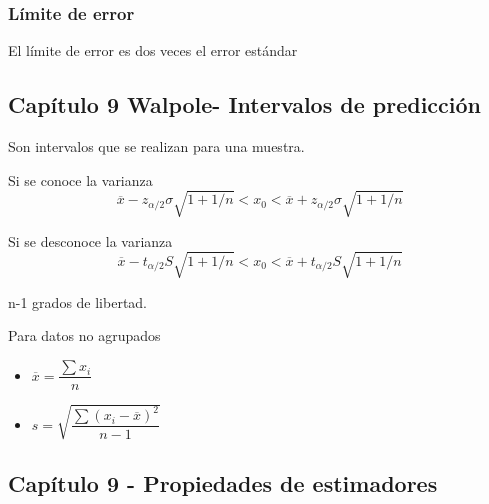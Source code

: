 \subsubsection{Límite de error}
El límite de error es dos veces el error estándar

\subsection{Capítulo 9 Walpole- Intervalos de predicción}
Son intervalos que se realizan para una muestra.

Si se conoce la varianza
$$\overline{x}-z_{\alpha/2}\sigma\sqrt{1+1/n}<x_0<\overline{x}+z_{\alpha/2}\sigma\sqrt{1+1/n}$$

Si se desconoce la varianza
$$\overline{x}-t_{\alpha/2}S\sqrt{1+1/n}<x_0<\overline{x}+t_{\alpha/2}S\sqrt{1+1/n}$$

n-1 grados de libertad.

Para datos no agrupados
\begin{itemize}
	\item $\overline{x}=\dfrac{\sum x_i}{n}$
	\item $s=\sqrt{\dfrac{\sum (x_i-\overline{x})^2}{n-1}}$
\end{itemize}

\subsection{Capítulo 9 - Propiedades de estimadores}
